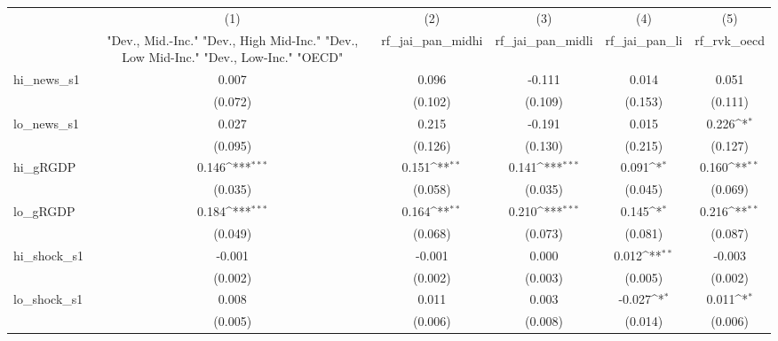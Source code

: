 {
\def\sym#1{\ifmmode^{#1}\else\(^{#1}\)\fi}
\begin{tabular}{l*{5}{c}}
\toprule
            &\multicolumn{1}{c}{(1)}&\multicolumn{1}{c}{(2)}&\multicolumn{1}{c}{(3)}&\multicolumn{1}{c}{(4)}&\multicolumn{1}{c}{(5)}\\
            &\multicolumn{1}{c}{ "Dev., Mid.-Inc." "Dev., High Mid-Inc." "Dev., Low Mid-Inc." "Dev., Low-Inc." "OECD" }&\multicolumn{1}{c}{rf\_jai\_pan\_midhi}&\multicolumn{1}{c}{rf\_jai\_pan\_midli}&\multicolumn{1}{c}{rf\_jai\_pan\_li}&\multicolumn{1}{c}{rf\_rvk\_oecd}\\
\midrule
hi\_news\_s1  &       0.007         &       0.096         &      -0.111         &       0.014         &       0.051         \\
            &     (0.072)         &     (0.102)         &     (0.109)         &     (0.153)         &     (0.111)         \\
\addlinespace
lo\_news\_s1  &       0.027         &       0.215         &      -0.191         &       0.015         &       0.226\sym{*}  \\
            &     (0.095)         &     (0.126)         &     (0.130)         &     (0.215)         &     (0.127)         \\
\addlinespace
hi\_gRGDP    &       0.146\sym{***}&       0.151\sym{**} &       0.141\sym{***}&       0.091\sym{*}  &       0.160\sym{**} \\
            &     (0.035)         &     (0.058)         &     (0.035)         &     (0.045)         &     (0.069)         \\
\addlinespace
lo\_gRGDP    &       0.184\sym{***}&       0.164\sym{**} &       0.210\sym{***}&       0.145\sym{*}  &       0.216\sym{**} \\
            &     (0.049)         &     (0.068)         &     (0.073)         &     (0.081)         &     (0.087)         \\
\addlinespace
hi\_shock\_s1 &      -0.001         &      -0.001         &       0.000         &       0.012\sym{**} &      -0.003         \\
            &     (0.002)         &     (0.002)         &     (0.003)         &     (0.005)         &     (0.002)         \\
\addlinespace
lo\_shock\_s1 &       0.008         &       0.011         &       0.003         &      -0.027\sym{*}  &       0.011\sym{*}  \\
            &     (0.005)         &     (0.006)         &     (0.008)         &     (0.014)         &     (0.006)         \\

\end{tabular}}
